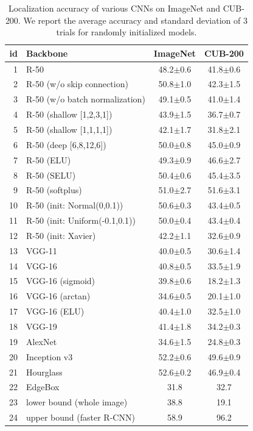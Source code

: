 \documentclass[letterpaper]{article}
\begin{document}
\begin{table}
	\caption{Localization accuracy of various CNNs on ImageNet and CUB-200. We report the average accuracy and standard deviation of 3 trials for randomly initialized models.}
	\label{tab:loc-results-more}
	\centering
	\setlength{\tabcolsep}{3pt}
	\renewcommand{\arraystretch}{0.95}
	\renewcommand{\multirowsetup}{\centering}
	\begin{tabular}{r|l|c|c}
		\hline
		id &Backbone  &
		ImageNet & CUB-200 \\
		\hline
		1&R-50 &48.2$\pm$0.6	&41.8$\pm$0.6 \\
		2&R-50 (w/o skip connection) & 50.8$\pm$1.0&42.3$\pm$1.5 \\
		3&R-50 (w/o batch normalization) &49.1$\pm$0.5&41.0$\pm$1.4 \\
		4&R-50 (shallow [1,2,3,1])&43.9$\pm$1.5&36.7$\pm$0.7 \\
		5&R-50 (shallow [1,1,1,1])&42.1$\pm$1.7&	31.8$\pm$2.1\\
		6&R-50 (deep [6,8,12,6])&50.0$\pm$0.8&45.0$\pm$0.9\\
		7&R-50 (ELU)&	49.3$\pm$0.9 & 46.6$\pm$2.7\\
		8&R-50 (SELU)& 50.4$\pm$0.6 & 45.4$\pm$3.5\\
		9&R-50 (softplus)& 51.0$\pm$2.7&	51.6$\pm$3.1\\
		10&R-50 (init: Normal(0,0.1)) & 50.6$\pm$0.3 & 43.4$\pm$0.5\\
		11&R-50 (init: Uniform(-0.1,0.1)) & 50.0$\pm$0.4 & 43.4$\pm$0.4 \\
		12&R-50 (init: Xavier) & 42.2$\pm$1.1 & 32.6$\pm$0.9 \\
		\hline
		13&VGG-11 &	40.0$\pm$0.5&	30.6$\pm$1.4 \\
		14&VGG-16 &	40.8$\pm$0.5&	33.5$\pm$1.9\\
		15&VGG-16 (sigmoid)&	39.8$\pm$0.6&	18.2$\pm$1.3 \\
		16&VGG-16 (arctan)	&34.6$\pm$0.5&20.1$\pm$1.0\\
		17&VGG-16 (ELU)	&40.4$\pm$1.0&32.5$\pm$1.0\\
		18&VGG-19 &	41.4$\pm$1.8&	34.2$\pm$0.3\\
		\hline
		19&AlexNet	&34.6$\pm$1.5&	24.8$\pm$0.3 \\
		\hline
		20&Inception v3&	52.2$\pm$0.6&49.6$\pm$0.9\\
		\hline
		21&Hourglass& 52.6$\pm$0.2&46.9$\pm$0.4\\
		\hline
		22&EdgeBox&	31.8&	32.7\\
		23&lower bound (whole image)&	38.8&	19.1\\
		24&upper bound (faster R-CNN)&	58.9&	96.2\\
		\hline
	\end{tabular}
\end{table}
\end{document}

